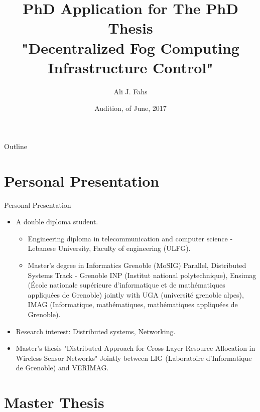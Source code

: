 \documentclass{beamer}
\title{PhD Application for The PhD Thesis\\ "Decentralized Fog Computing Infrastructure Control"}
\subtitle{}
\author{Ali J. Fahs}%
\institute[Institut de Recherche en Informatique et Systèmes Aléatoires (IRISA)] %
{
 Supervised by Professor Guillaume Pierre 
   }
\date{Audition, \nth{8} of June, 2017}
\begin{document}
\begin{frame}
  \titlepage
\end{frame}

\begin{frame}{Outline}
  \tableofcontents
 
\end{frame}

\section{Personal Presentation}
\begin{frame}{Personal Presentation}
\begin{itemize}
\item A double diploma student.
\begin{itemize}
\item Engineering diploma in telecommunication and computer science - Lebanese University, Faculty of engineering (ULFG).
\item Master's degree in Informatics Grenoble (MoSIG) Parallel, Distributed Systems Track - Grenoble INP (Institut national polytechnique), Ensimag (\'Ecole nationale sup\'erieure d'informatique et de math\'ematiques appliqu\'ees de Grenoble) jointly with UGA (universit\'e grenoble alpes), IMAG (Informatique, math\'ematiques, math\'ematiques appliqu\'ees de Grenoble).
\end{itemize}

\item Research interest: Distributed systems, Networking.
\item Master's thesis "Distributed Approach for Cross-Layer Resource Allocation in Wireless Sensor Networks" Jointly between LIG (Laboratoire d'Informatique de Grenoble) and VERIMAG.
\end{itemize}

 
\end{frame}


\section{Master Thesis}
\end{document}
